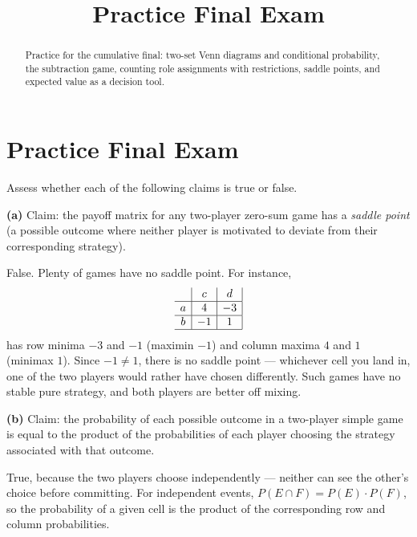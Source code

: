\documentclass[12pt]{ximera}
\title{Practice Final Exam}
\begin{document}
\begin{abstract}
Practice for the cumulative final: two-set Venn diagrams and conditional probability,
the subtraction game, counting role assignments with restrictions, saddle points, and
expected value as a decision tool.
\end{abstract}
\maketitle

\section*{Practice Final Exam}

\begin{problem}
Assess whether each of the following claims is true or false.

\begin{prompt}
\textbf{(a)} Claim: the payoff matrix for any two-player zero-sum game has a
\emph{saddle point} (a possible outcome where neither player is motivated to deviate
from their corresponding strategy).

\begin{multipleChoice}
\end{multipleChoice}

\begin{solution}
False. Plenty of games have no saddle point. For instance,
\[
\begin{array}{c|c|c|}
\phantom{|} & c & d \\\hline
a & 4 & -3 \\\hline
b & -1 & 1 \\\hline
\end{array}
\]
has row minima $-3$ and $-1$ (maximin $-1$) and column maxima $4$ and $1$
(minimax $1$). Since $-1\neq 1$, there is no saddle point --- whichever cell you
land in, one of the two players would rather have chosen differently. Such games have
no stable pure strategy, and both players are better off mixing.
\end{solution}
\end{prompt}

\begin{prompt}
\textbf{(b)} Claim: the probability of each possible outcome in a two-player simple
game is equal to the product of the probabilities of each player choosing the
strategy associated with that outcome.

\begin{multipleChoice}
\end{multipleChoice}

\begin{solution}
True, because the two players choose independently --- neither can see the other's
choice before committing. For independent events,
$P(E\cap F)=P(E)\cdot P(F)$, so the probability of a given cell is the product of the
corresponding row and column probabilities.
\end{solution}
\end{prompt}
\end{problem}
\end{document}
